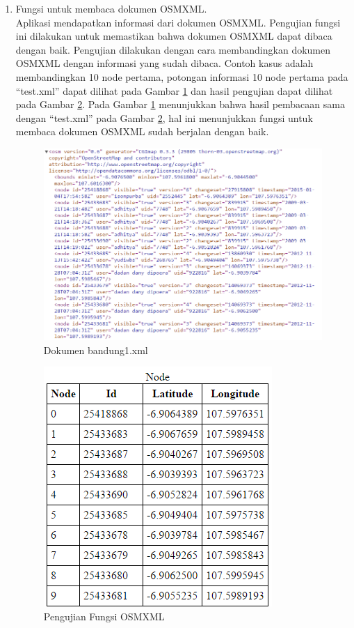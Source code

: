 \begin{enumerate}
  \item Fungsi untuk membaca dokumen OSMXML.\\
  Aplikasi mendapatkan informasi dari dokumen OSMXML. Pengujian
  fungsi ini dilakukan untuk memastikan bahwa dokumen OSMXML dapat dibaca dengan
  baik. Pengujian dilakukan dengan cara membandingkan dokumen OSMXML dengan
  informasi yang sudah dibaca. Contoh kasus adalah membandingkan 10 node
  pertama, potongan informasi 10 node pertama pada ``test.xml'' dapat dilihat
  pada Gambar \ref{fig:pu_osmxml2} dan hasil pengujian dapat dilihat pada Gambar
  \ref{fig:pu_osmxml1}. Pada Gambar \ref{fig:pu_osmxml2} menunjukkan bahwa hasil
  pembacaan sama dengan ``test.xml'' pada Gambar \ref{fig:pu_osmxml1}, hal ini
  menunjukkan fungsi untuk membaca dokumen OSMXML sudah berjalan dengan baik.
\begin{figure}[h]
\centering
\includegraphics[scale=0.7]{Gambar/pu_osmxml2}
\caption[Dokumen test.xml]{Dokumen bandung1.xml}
\label{fig:pu_osmxml2}
\end{figure}

\begin{figure}[h]
\centering
\includegraphics[scale=1]{Gambar/pu_osmxml1}
\caption[Pengujian Fungsi OSMXML]{Pengujian Fungsi OSMXML}
\label{fig:pu_osmxml1}
\end{figure}
\clearpage


\end{enumerate}
